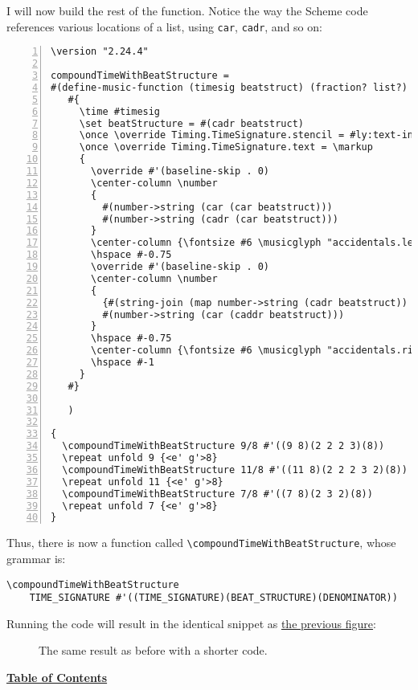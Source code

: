 I will now build the rest of the function. Notice the way the Scheme code references various locations of a list, using \verb|car|, \verb|cadr|, and so on:

\begin{Verbatim}[numbers=left,xleftmargin=5mm]
\version "2.24.4"

compoundTimeWithBeatStructure =
#(define-music-function (timesig beatstruct) (fraction? list?)
   #{
     \time #timesig
     \set beatStructure = #(cadr beatstruct)
     \once \override Timing.TimeSignature.stencil = #ly:text-interface::print
     \once \override Timing.TimeSignature.text = \markup
     {
       \override #'(baseline-skip . 0)
       \center-column \number
       {
         #(number->string (car (car beatstruct)))
         #(number->string (cadr (car beatstruct)))
       }
       \center-column {\fontsize #6 \musicglyph "accidentals.leftparen"}
       \hspace #-0.75
       \override #'(baseline-skip . 0)
       \center-column \number
       {
         {#(string-join (map number->string (cadr beatstruct)) "+")}
         #(number->string (car (caddr beatstruct)))
       }
       \hspace #-0.75
       \center-column {\fontsize #6 \musicglyph "accidentals.rightparen"}
       \hspace #-1
     }
   #}

   )

{
  \compoundTimeWithBeatStructure 9/8 #'((9 8)(2 2 2 3)(8))
  \repeat unfold 9 {<e' g'>8}
  \compoundTimeWithBeatStructure 11/8 #'((11 8)(2 2 2 3 2)(8))
  \repeat unfold 11 {<e' g'>8}
  \compoundTimeWithBeatStructure 7/8 #'((7 8)(2 3 2)(8))
  \repeat unfold 7 {<e' g'>8}
}
\end{Verbatim}

Thus, there is now a function called \verb|\compoundTimeWithBeatStructure|, whose grammar is:

\begin{Verbatim}
\compoundTimeWithBeatStructure 
	TIME_SIGNATURE #'((TIME_SIGNATURE)(BEAT_STRUCTURE)(DENOMINATOR))
\end{Verbatim}

Running the code will result in the identical snippet as \hyperref[fig:figure6]{the previous figure}:


	\begin{figure}[!htb]
	\centering
{}
	\caption{\label{fig:figure7} The same result as before with a shorter code.}
	\end{figure}
	
\par
 

\hyperref[sec:toc]{\textbf{Table of Contents}}

\vfill \break

